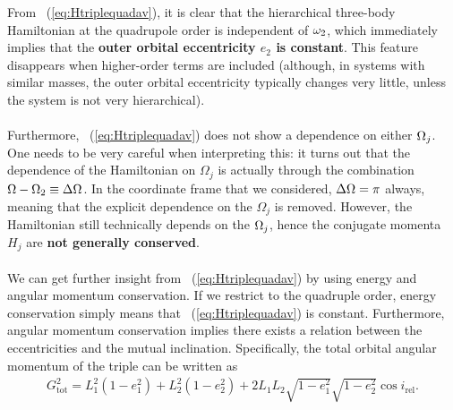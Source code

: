 \documentclass[main.tex]{subfiles}
\begin{document}
\begin{tcolorbox}[sharp corners, colback=green!30, colframe=green!80!blue, title=Box \ref{boxchap3:dynVI} -- Orbital dynamics VI (continued)]
{From \Eq~(\ref{eq:Htriplequadav}), it is clear that the hierarchical three-body Hamiltonian at the quadrupole order is independent of $\omega_2$, which immediately implies that the {\bf outer orbital eccentricity $e_2$ is constant}. This feature disappears when higher-order terms are included (although, in systems with similar masses, the outer orbital eccentricity typically changes very little, unless the system is not very hierarchical). \\ \\
Furthermore, \Eq~(\ref{eq:Htriplequadav}) does not show a dependence on either $\Omega_j$. One needs to be very careful when interpreting this: it turns out that the dependence of the Hamiltonian on $\Omega_j$ is actually through the combination $\Omega - \Omega_2 \equiv \Delta \Omega$. In the coordinate frame that we considered, $\Delta \Omega = \pi$ always, meaning that the explicit dependence on the $\Omega_j$ is removed. However, the Hamiltonian still technically depends on the $\Omega_j$, hence the conjugate momenta $H_j$ are {\bf not generally conserved}. \\ \\
We can get further insight from \Eq~(\ref{eq:Htriplequadav}) by using energy and angular momentum conservation. If we restrict to the quadruple order, energy conservation simply means that \Eq~(\ref{eq:Htriplequadav}) is constant. Furthermore, angular momentum conservation implies there exists a relation between the eccentricities and the mutual inclination. Specifically, the total orbital angular momentum of the triple can be written as
\begin{align}
\label{eq:AM_triple}
G_\mathrm{tot}^2 = L_1^2 \left(1-e_1^2 \right ) + L_2^2 \left(1-e_2^2 \right ) + 2L_1 L_2 \sqrt{1-e_1^2} \sqrt{1-e_2^2} \cos i_\mathrm{rel}.
\end{align}}
\end{tcolorbox}
\end{document}
